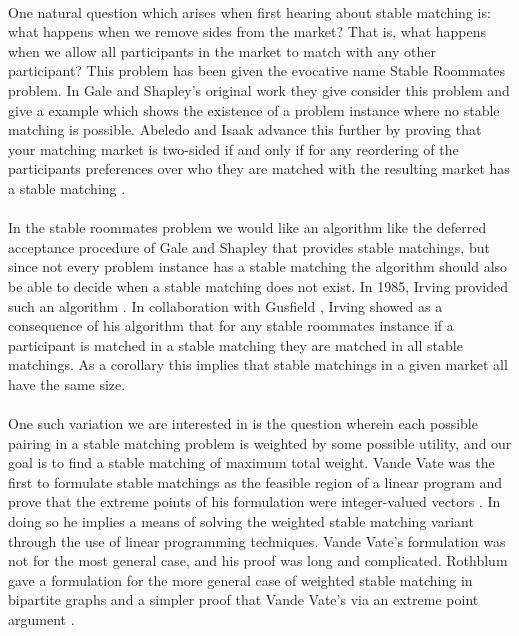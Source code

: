 \paragraph{}
One natural question which arises when first hearing about stable matching is: what happens when we remove sides from the market? That is, what happens when we allow all participants in the market to match with any other participant? This problem has been given the evocative name Stable Roommates problem. In Gale and Shapley's original work \cite{gale1962college} they give consider this problem and give a example which shows the existence of a problem instance where no stable matching is possible.  Abeledo and Isaak advance this further by proving that your matching market is two-sided if and only if for any reordering of the participants preferences over who they are matched with the resulting market has a stable matching \cite{abeledo1991characterization}.
\paragraph{}
In the stable roommates problem we would like an algorithm like the deferred acceptance procedure of Gale and Shapley that provides stable matchings, but since not every problem instance has a stable matching the algorithm should also be able to decide when a stable matching does not exist. In 1985, Irving provided such an algorithm \cite{irving1985efficient}. In collaboration with Gusfield \cite{irving1987efficient}, Irving showed as a consequence of his algorithm that for any stable roommates instance if a participant is matched in a stable matching they are matched in all stable matchings. As a corollary this implies that stable matchings in a given market all have the same size.
\paragraph{}
One such variation we are interested in is the question wherein each possible pairing in a stable matching problem is weighted by some possible utility, and our goal is to find a stable matching of maximum total weight. Vande Vate was the first to formulate stable matchings as the feasible region of a linear program and prove that the extreme points of his formulation were integer-valued vectors \cite{vate1989linear}. In doing so he implies a means of solving the weighted stable matching variant through the use of linear programming techniques. Vande Vate's formulation was not for the most general case, and his proof was long and complicated. Rothblum gave a formulation for the more general case of weighted stable matching in bipartite graphs and a simpler proof that Vande Vate's via an extreme point argument \cite{rothblum1992characterization}.
